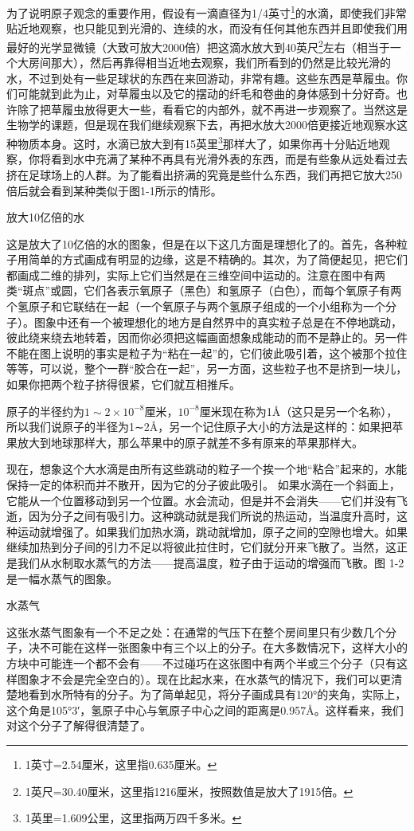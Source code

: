 \documentclass[12pt,oneside]{book}
\begin{document}
\begin{common-format}
为了说明原子观念的重要作用，假设有一滴直径为1/4英寸\footnote{1英寸=2.54厘米，这里指0.635厘米。}的水滴，即使我们非常贴近地观察，也只能见到光滑的、连续的水，而没有任何其他东西并且即使我们用最好的光学显微镜（大致可放大2000倍）把这滴水放大到40英尺\footnote{1英尺=30.40厘米，这里指1216厘米，按照数值是放大了1915倍。}左右（相当于一个大房间那大），然后再靠得相当近地去观察，我们所看到的仍然是比较光滑的水，不过到处有一些足球状的东西在来回游动，非常有趣。这些东西是草履虫。你们可能就到此为止，对草履虫以及它的摆动的纤毛和卷曲的身体感到十分好奇。也许除了把草履虫放得更大一些，看看它的内部外，就不再进一步观察了。当然这是生物学的课题，但是现在我们继续观察下去，再把水放大2000倍更接近地观察水这种物质本身。这时，水滴已放大到有15英里\footnote{1英里=1.609公里，这里指两万四千多米。}那样大了，如果你再十分贴近地观察，你将看到水中充满了某种不再具有光滑外表的东西，而是有些象从远处看过去挤在足球场上的人群。为了能看出挤满的究竟是些什么东西，我们再把它放大250倍后就会看到某种类似于图1-1所示的情形。
\begin{fig}{放大10亿倍的水}
\caption{放大10亿倍的水}
\label{fig:放大10亿倍的水}
\end{fig}
这是放大了10亿倍的水的图象，但是在以下这几方面是理想化了的。首先，各种粒子用简单的方式画成有明显的边缘，这是不精确的。其次，为了简便起见，把它们都画成二维的排列，实际上它们当然是在三维空间中运动的。注意在图中有两类“斑点”或圆，它们各表示氧原子（黑色）和氢原子（白色），而每个氧原子有两个氢原子和它联结在一起（一个氧原子与两个氢原子组成的一个小组称为一个分子）。图象中还有一个被理想化的地方是自然界中的真实粒子总是在不停地跳动，彼此绕来绕去地转着，因而你必须把这幅画面想象成能动的而不是静止的。另一件不能在图上说明的事实是粒子为“粘在一起”的，它们彼此吸引着，这个被那个拉住等等，可以说，整个一群“胶合在一起”，另一方面，这些粒子也不是挤到一块儿，如果你把两个粒子挤得很紧，它们就互相推斥。

原子的半径约为$1\sim2\times10^{-8}$厘米，$ 10^{-8} $厘米现在称为1Å（这只是另一个名称），所以我们说原子的半径为1∼2Å，另一个记住原子大小的方法是这样的：如果把苹果放大到地球那样大，那么苹果中的原子就差不多有原来的苹果那样大。

现在，想象这个大水滴是由所有这些跳动的粒子一个挨一个地“粘合”起来的，水能保持一定的体积而并不散开，因为它的分子彼此吸引。 如果水滴在一个斜面上，它能从一个位置移动到另一个位置。水会流动，但是并不会消失——它们并没有飞逝，因为分子之间有吸引力。这种跳动就是我们所说的热运动，当温度升高时，这种运动就增强了。如果我们加热水滴，跳动就增加，原子之间的空隙也增大。如果继续加热到分子间的引力不足以将彼此拉住时，它们就分开来飞散了。当然，这正是我们从水制取水蒸气的方法——提高温度，粒子由于运动的增强而飞散。图 1-2是一幅水蒸气的图象。
\begin{fig}{水蒸气}
\caption{水蒸气}
\label{fig:水蒸气}
\end{fig}
这张水蒸气图象有一个不足之处：在通常的气压下在整个房间里只有少数几个分子，决不可能在这样一张图象中有三个以上的分子。在大多数情况下，这样大小的方块中可能连一个都不会有——不过碰巧在这张图中有两个半或三个分子（只有这样图象才不会是完全空白的）。现在比起水来，在水蒸气的情况下，我们可以更清楚地看到水所特有的分子。为了简单起见，将分子画成具有120°的夹角，实际上，这个角是105°3′，氢原子中心与氧原子中心之间的距离是0.957Å。这样看来，我们对这个分子了解得很清楚了。


\end{common-format}
\end{document}
